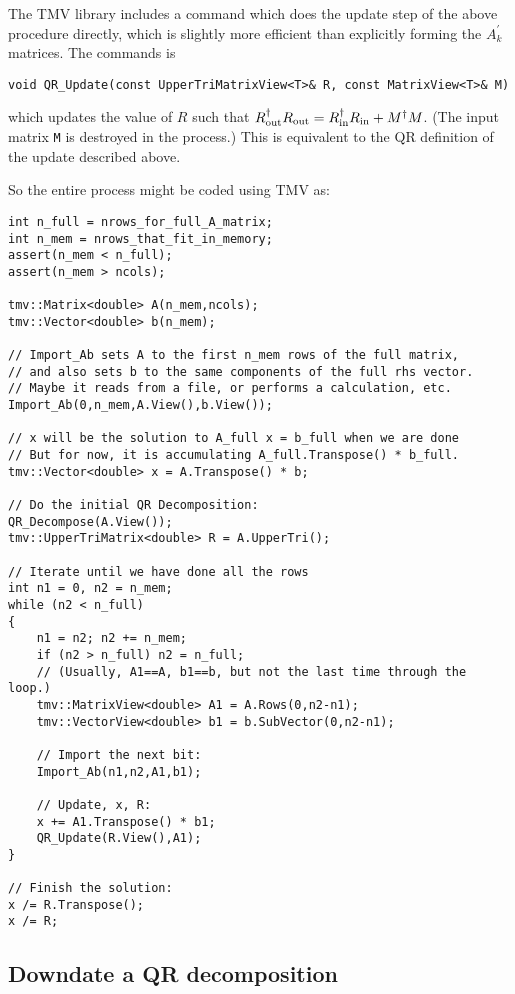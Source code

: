 \documentclass[twoside,letterpaper,11pt]{article}
\renewcommand{\tt}[1]{{\texttt {#1}}}
\begin{document}
The TMV library includes a command which does the update step of the above procedure
directly, which is slightly more efficient than explicitly forming the $A_k^\prime$ matrices.
The commands is
\begin{verbatim}
void QR_Update(const UpperTriMatrixView<T>& R, const MatrixView<T>& M)
\end{verbatim}
which updates the value of $R$ such that $R_{\rm out}^\dagger R_{\rm out} =
R_{\rm in}^\dagger R_{\rm in} + M^\dagger M$.
(The input matrix \tt{M} is destroyed in the process.)  This is equivalent to the QR
definition of the update described above.

So the entire process might be coded using TMV as:
\begin{verbatim}
int n_full = nrows_for_full_A_matrix;
int n_mem = nrows_that_fit_in_memory;
assert(n_mem < n_full);
assert(n_mem > ncols);

tmv::Matrix<double> A(n_mem,ncols); 
tmv::Vector<double> b(n_mem);

// Import_Ab sets A to the first n_mem rows of the full matrix, 
// and also sets b to the same components of the full rhs vector.
// Maybe it reads from a file, or performs a calculation, etc.
Import_Ab(0,n_mem,A.View(),b.View());

// x will be the solution to A_full x = b_full when we are done
// But for now, it is accumulating A_full.Transpose() * b_full.
tmv::Vector<double> x = A.Transpose() * b;

// Do the initial QR Decomposition:
QR_Decompose(A.View());
tmv::UpperTriMatrix<double> R = A.UpperTri();

// Iterate until we have done all the rows
int n1 = 0, n2 = n_mem;
while (n2 < n_full) 
{
    n1 = n2; n2 += n_mem;
    if (n2 > n_full) n2 = n_full;
    // (Usually, A1==A, b1==b, but not the last time through the loop.)
    tmv::MatrixView<double> A1 = A.Rows(0,n2-n1);
    tmv::VectorView<double> b1 = b.SubVector(0,n2-n1);

    // Import the next bit:
    Import_Ab(n1,n2,A1,b1);

    // Update, x, R:
    x += A1.Transpose() * b1;
    QR_Update(R.View(),A1);
}

// Finish the solution:
x /= R.Transpose();
x /= R;
\end{verbatim}

\subsection{Downdate a QR decomposition}
\label{downdate}
\end{document}
